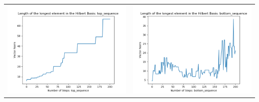 \documentclass[10pt]{article}
\begin{document}
\begin{tabular}{c|c}
\begin{minipage}{.45\textwidth}
\includegraphics[width=\textwidth]{"DATA/5d/6 generators 2 bound G/top_sequence LENGTH"}
\end{minipage} &
\begin{minipage}{.45\textwidth}
\includegraphics[width=\textwidth]{"DATA/5d/6 generators 2 bound G bottomup/bottom_sequence LENGTH"}
\end{minipage}
\end{tabular}
\end{document}
